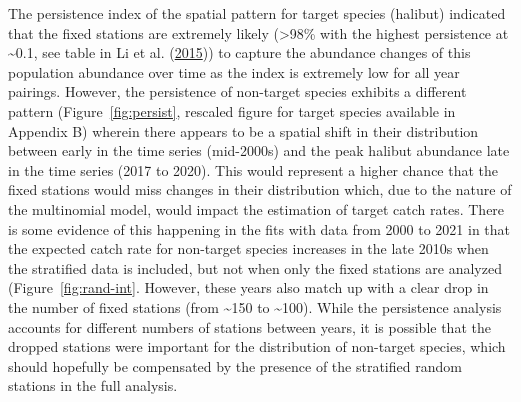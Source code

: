 \documentclass[12pt]{article}\usepackage[]{graphicx}\usepackage[]{color}
\begin{document}
The persistence index of the spatial pattern for target species (halibut) indicated that the fixed stations are extremely likely (\textgreater98\% with the highest persistence at \textasciitilde0.1, see table in Li et al. (\protect\hyperlink{ref-Li2015}{2015})) to capture the abundance changes of this population abundance over time as the index is extremely low for all year pairings. However, the persistence of non-target species exhibits a different pattern (Figure~\ref{fig:persist}, rescaled figure for target species available in Appendix B) wherein there appears to be a spatial shift in their distribution between early in the time series (mid-2000s) and the peak halibut abundance late in the time series (2017 to 2020). This would represent a higher chance that the fixed stations would miss changes in their distribution which, due to the nature of the multinomial model, would impact the estimation of target catch rates. There is some evidence of this happening in the fits with data from 2000 to 2021 in that the expected catch rate for non-target species increases in the late 2010s when the stratified data is included, but not when only the fixed stations are analyzed (Figure~\ref{fig:rand-int}. However, these years also match up with a clear drop in the number of fixed stations (from \textasciitilde150 to \textasciitilde100). While the persistence analysis accounts for different numbers of stations between years, it is possible that the dropped stations were important for the distribution of non-target species, which should hopefully be compensated by the presence of the stratified random stations in the full analysis.
\end{document}
